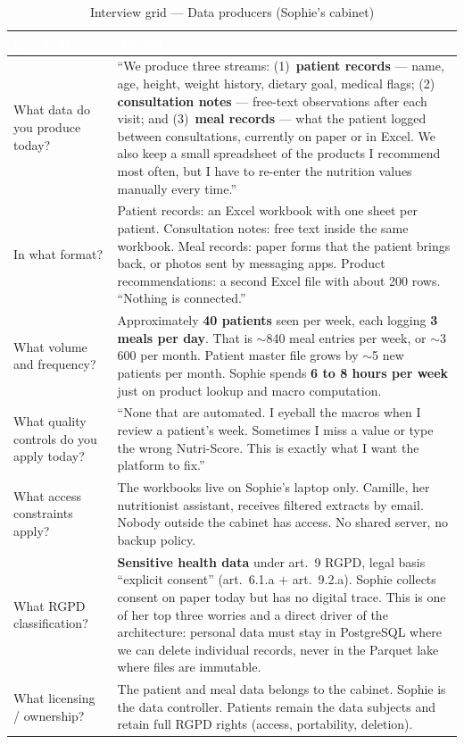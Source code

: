\documentclass[a4paper,11pt,oneside,openany]{report}
\newcommand{\rgpd}{RGPD}
\begin{document}
\begin{table}[H]
\centering
\caption{Interview grid --- Data producers (Sophie's cabinet)}
\label{tab:grid-prod}
\begin{tabularx}{\textwidth}{L{4cm} X}
\toprule
{}
\textcolor{white}{\textbf{Question}} & \textcolor{white}{\textbf{Answer}} \\
\midrule
What data do you produce today? &
``We produce three streams: (1)~\textbf{patient records} --- name,
age, height, weight history, dietary goal, medical flags; (2)~\textbf{
consultation notes} --- free-text observations after each visit;
and (3)~\textbf{meal records} --- what the patient logged between
consultations, currently on paper or in Excel. We also keep a small
spreadsheet of the products I recommend most often, but I have to
re-enter the nutrition values manually every time.''
\\
\addlinespace
In what format? &
Patient records: an Excel workbook with one sheet per patient.
Consultation notes: free text inside the same workbook. Meal
records: paper forms that the patient brings back, or photos sent
by messaging apps. Product recommendations: a second Excel file
with about 200 rows. ``Nothing is connected.''
\\
\addlinespace
What volume and frequency? &
Approximately \textbf{40 patients} seen per week, each logging
\textbf{3 meals per day}. That is $\sim$840 meal entries per week,
or $\sim$3\,600 per month. Patient master file grows by $\sim$5
new patients per month. Sophie spends \textbf{6 to 8 hours per
week} just on product lookup and macro computation.
\\
\addlinespace
What quality controls do you apply today? &
``None that are automated. I eyeball the macros when I review a
patient's week. Sometimes I miss a value or type the wrong
Nutri-Score. This is exactly what I want the platform to fix.''
\\
\addlinespace
What access constraints apply? &
The workbooks live on Sophie's laptop only. Camille, her
nutritionist assistant, receives filtered extracts by email.
Nobody outside the cabinet has access. No shared server, no
backup policy.
\\
\addlinespace
What \rgpd{} classification? &
\textbf{Sensitive health data} under art.~9 \rgpd{}, legal basis
``explicit consent'' (art.~6.1.a $+$ art.~9.2.a). Sophie collects
consent on paper today but has no digital trace. This is one of
her top three worries and a direct driver of the architecture:
personal data must stay in PostgreSQL where we can delete
individual records, never in the Parquet lake where files are
immutable.
\\
\addlinespace
What licensing / ownership? &
The patient and meal data belongs to the cabinet. Sophie is the
data controller. Patients remain the data subjects and retain
full \rgpd{} rights (access, portability, deletion).
\\
\bottomrule
\end{tabularx}
\end{table}
\end{document}
